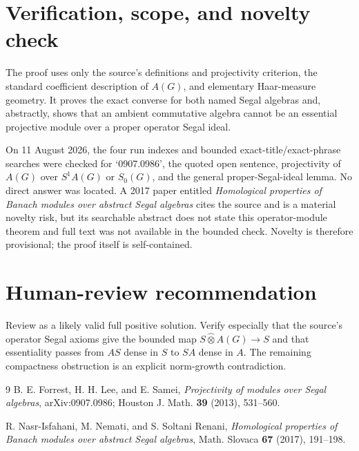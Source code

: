 \documentclass[11pt]{article}
\newcommand{\A}{A(G)}
\newcommand{\opten}{\widehat\otimes}
\begin{document}
\section*{Verification, scope, and novelty check}
The proof uses only the source's definitions and projectivity criterion, the standard coefficient description of $\A$, and elementary Haar-measure geometry.  It proves the exact converse for both named Segal algebras and, abstractly, shows that an ambient commutative algebra cannot be an essential projective module over a proper operator Segal ideal.

On 11 August 2026, the four run indexes and bounded exact-title/exact-phrase searches were checked for `0907.0986', the quoted open sentence, projectivity of $A(G)$ over $S^1A(G)$ or $S_0(G)$, and the general proper-Segal-ideal lemma.  No direct answer was located.  A 2017 paper entitled \emph{Homological properties of Banach modules over abstract Segal algebras} cites the source and is a material novelty risk, but its searchable abstract does not state this operator-module theorem and full text was not available in the bounded check.  Novelty is therefore provisional; the proof itself is self-contained.

\section*{Human-review recommendation}
Review as a likely valid full positive solution.  Verify especially that the source's operator Segal axioms give the bounded map $S\opten\A\to S$ and that essentiality passes from $A S$ dense in $S$ to $S A$ dense in $A$.  The remaining compactness obstruction is an explicit norm-growth contradiction.

\begin{thebibliography}{9}
B. E. Forrest, H. H. Lee, and E. Samei,
\emph{Projectivity of modules over Segal algebras},
arXiv:0907.0986; Houston J. Math. \textbf{39} (2013), 531--560.

R. Nasr-Isfahani, M. Nemati, and S. Soltani Renani,
\emph{Homological properties of Banach modules over abstract Segal algebras},
Math. Slovaca \textbf{67} (2017), 191--198.
\end{thebibliography}
\end{document}
